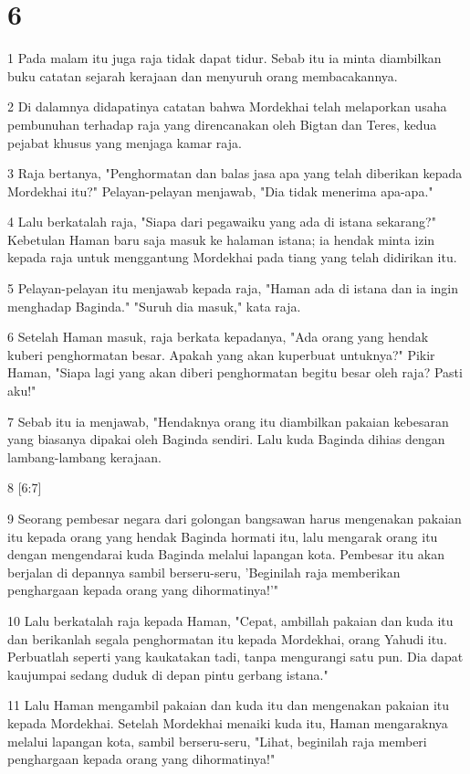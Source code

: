 \chapter{6}

\par 1 Pada malam itu juga raja tidak dapat tidur. Sebab itu ia minta diambilkan buku catatan sejarah kerajaan dan menyuruh orang membacakannya.
\par 2 Di dalamnya didapatinya catatan bahwa Mordekhai telah melaporkan usaha pembunuhan terhadap raja yang direncanakan oleh Bigtan dan Teres, kedua pejabat khusus yang menjaga kamar raja.
\par 3 Raja bertanya, "Penghormatan dan balas jasa apa yang telah diberikan kepada Mordekhai itu?" Pelayan-pelayan menjawab, "Dia tidak menerima apa-apa."
\par 4 Lalu berkatalah raja, "Siapa dari pegawaiku yang ada di istana sekarang?" Kebetulan Haman baru saja masuk ke halaman istana; ia hendak minta izin kepada raja untuk menggantung Mordekhai pada tiang yang telah didirikan itu.
\par 5 Pelayan-pelayan itu menjawab kepada raja, "Haman ada di istana dan ia ingin menghadap Baginda." "Suruh dia masuk," kata raja.
\par 6 Setelah Haman masuk, raja berkata kepadanya, "Ada orang yang hendak kuberi penghormatan besar. Apakah yang akan kuperbuat untuknya?" Pikir Haman, "Siapa lagi yang akan diberi penghormatan begitu besar oleh raja? Pasti aku!"
\par 7 Sebab itu ia menjawab, "Hendaknya orang itu diambilkan pakaian kebesaran yang biasanya dipakai oleh Baginda sendiri. Lalu kuda Baginda dihias dengan lambang-lambang kerajaan.
\par 8 [6:7]
\par 9 Seorang pembesar negara dari golongan bangsawan harus mengenakan pakaian itu kepada orang yang hendak Baginda hormati itu, lalu mengarak orang itu dengan mengendarai kuda Baginda melalui lapangan kota. Pembesar itu akan berjalan di depannya sambil berseru-seru, 'Beginilah raja memberikan penghargaan kepada orang yang dihormatinya!'"
\par 10 Lalu berkatalah raja kepada Haman, "Cepat, ambillah pakaian dan kuda itu dan berikanlah segala penghormatan itu kepada Mordekhai, orang Yahudi itu. Perbuatlah seperti yang kaukatakan tadi, tanpa mengurangi satu pun. Dia dapat kaujumpai sedang duduk di depan pintu gerbang istana."
\par 11 Lalu Haman mengambil pakaian dan kuda itu dan mengenakan pakaian itu kepada Mordekhai. Setelah Mordekhai menaiki kuda itu, Haman mengaraknya melalui lapangan kota, sambil berseru-seru, "Lihat, beginilah raja memberi penghargaan kepada orang yang dihormatinya!"
